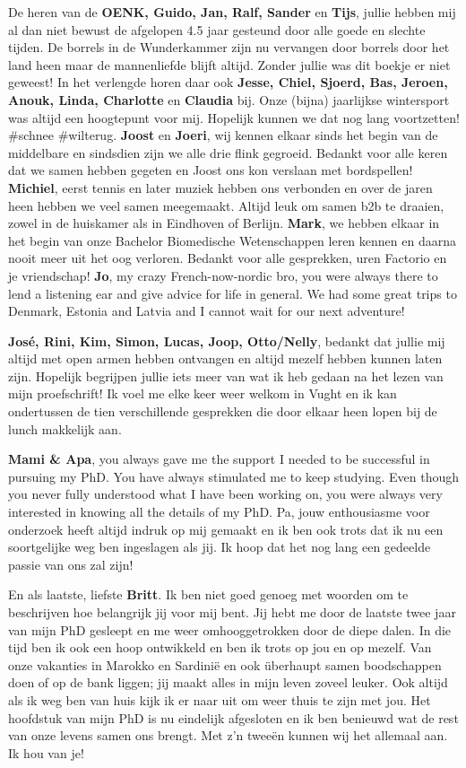 De heren van de \textbf{OENK, Guido, Jan, Ralf, Sander} en \textbf{Tijs}, jullie hebben mij al dan niet bewust de afgelopen 4.5 jaar gesteund door alle goede en slechte tijden. De borrels in de Wunderkammer zijn nu vervangen door borrels door het land heen maar de mannenliefde blijft altijd. Zonder jullie was dit boekje er niet geweest! In het verlengde horen daar ook \textbf{Jesse, Chiel, Sjoerd, Bas, Jeroen, Anouk, Linda, Charlotte} en \textbf{Claudia} bij. Onze (bijna) jaarlijkse wintersport was altijd een hoogtepunt voor mij. Hopelijk kunnen we dat nog lang voortzetten! \#schnee \#wilterug. \textbf{Joost} en \textbf{Joeri}, wij kennen elkaar sinds het begin van de middelbare en sindsdien zijn we alle drie flink gegroeid. Bedankt voor alle keren dat we samen hebben gegeten en Joost ons kon verslaan met bordspellen! \textbf{Michiel}, eerst tennis en later muziek hebben ons verbonden en over de jaren heen hebben we veel samen meegemaakt. Altijd leuk om samen b2b te draaien, zowel in de huiskamer als in Eindhoven of Berlijn. \textbf{Mark}, we hebben elkaar in het begin van onze Bachelor Biomedische Wetenschappen leren kennen en daarna nooit meer uit het oog verloren. Bedankt voor alle gesprekken, uren Factorio en je vriendschap! \textbf{Jo}, my crazy French-now-nordic bro, you were always there to lend a listening ear and give advice for life in general. We had some great trips to Denmark, Estonia and Latvia and I cannot wait for our next adventure! 

\textbf{José, Rini, Kim, Simon, Lucas, Joop, Otto/Nelly}, bedankt dat jullie mij altijd met open armen hebben ontvangen en altijd mezelf hebben kunnen laten zijn. Hopelijk begrijpen jullie iets meer van wat ik heb gedaan na het lezen van mijn proefschrift! Ik voel me elke keer weer welkom in Vught en ik kan ondertussen de tien verschillende gesprekken die door elkaar heen lopen bij de lunch makkelijk aan.

\textbf{Mami \& Apa}, you always gave me the support I needed to be successful in pursuing my PhD. You have always stimulated me to keep studying. Even though you never fully understood what I have been working on, you were always very interested in knowing all the details of my PhD. Pa, jouw enthousiasme voor onderzoek heeft altijd indruk op mij gemaakt en ik ben ook trots dat ik nu een soortgelijke weg ben ingeslagen als jij. Ik hoop dat het nog lang een gedeelde passie van ons zal zijn!

En als laatste, liefste \textbf{Britt}. Ik ben niet goed genoeg met woorden om te beschrijven hoe belangrijk jij voor mij bent. Jij hebt me door de laatste twee jaar van mijn PhD gesleept en me weer omhooggetrokken door de diepe dalen. In die tijd ben ik ook een hoop ontwikkeld en ben ik trots op jou en op mezelf. Van onze vakanties in Marokko en Sardinië en ook überhaupt samen boodschappen doen of op de bank liggen; jij maakt alles in mijn leven zoveel leuker. Ook altijd als ik weg ben van huis kijk ik er naar uit om weer thuis te zijn met jou. Het hoofdstuk van mijn PhD is nu eindelijk afgesloten en ik ben benieuwd wat de rest van onze levens samen ons brengt. Met z’n tweeën kunnen wij het allemaal aan. Ik hou van je! 


